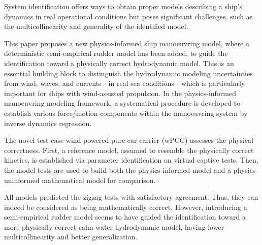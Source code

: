 System identification offers ways to obtain proper models describing a ship's dynamics in real operational conditions but poses significant challenges, such as the multicollinearity and generality of the identified model. 

This paper proposes a new physics-informed ship manoeuvring model, where a deterministic semi-empirical rudder model has been added, to guide the identification toward a physically correct hydrodynamic model.  
This is an essential building block to distinguish the hydrodynamic modeling uncertainties from wind, waves, and currents---in real sea conditions---which is particularly important for ships with wind-assisted propulsion.
In the physics-informed manoeuvring modeling framework, a systematical procedure is developed to establish various force/motion components within the manoeuvring system by inverse dynamics regression. 

The novel test case wind-powered pure car carrier (wPCC) assesses the physical correctness. First, a reference model, assumed to resemble the physically correct kinetics, is established via parameter identification on virtual captive tests. Then, the model tests are used to build both the physics-informed model and a physics-uninformed mathematical model for comparison.

All models predicted the zigzag tests with satisfactory agreement. Thus, they can indeed be considered as being mathematically correct. However, introducing a semi-empirical rudder model seems to have guided the identification toward a more physically correct calm water hydrodynamic model, having lower multicollinearity and better generalization.

